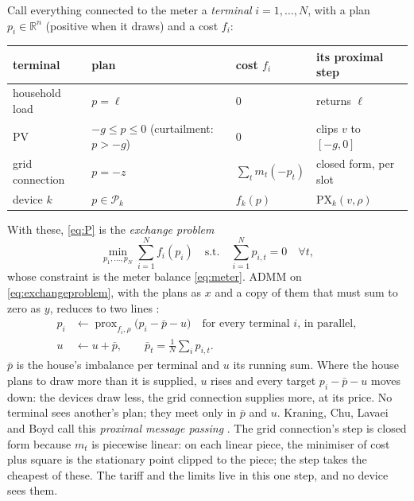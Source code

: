 \documentclass[11pt,a4paper]{article}
\newcommand{\R}{\mathbb{R}}
\newcommand{\PX}{\mathrm{PX}}
\newcommand{\Pk}{\mathcal P_k}
\begin{document}
Call everything connected to the meter a \emph{terminal} $i = 1,\dots,N$, with
a plan $p_i \in \R^n$ (positive when it draws) and a cost $f_i$:
\begin{center}
\small
\begin{tabular}{@{}llll@{}}
\toprule
terminal & plan & cost $f_i$ & its proximal step \\
\midrule
household load & $p = \ell$ & $0$ & returns $\ell$ \\
PV & $-g \le p \le 0$ (curtailment: $p > -g$) & $0$ & clips $v$ to $[-g, 0]$ \\
grid connection & $p = -z$ & $\sum_t m_t(-p_t)$ & closed form, per slot \\
device $k$ & $p \in \Pk$ & $f_k(p)$ & $\PX_k(v, \rho)$ \\
\bottomrule
\end{tabular}
\end{center}
With these, \eqref{eq:P} is the \emph{exchange problem}
\cite[\S7.3.2]{boyd2011}
\begin{equation}
  \min_{p_1,\dots,p_N} \sum_{i=1}^N f_i(p_i) \quad \text{s.t.} \quad
  \sum_{i=1}^N p_{i,t} = 0 \quad \forall t ,
  \label{eq:exchangeproblem}
\end{equation}
whose constraint is the meter balance \eqref{eq:meter}. ADMM on
\eqref{eq:exchangeproblem}, with the plans as $x$ and a copy of them that must
sum to zero as $y$, reduces to two lines \cite[\S7.3.2]{boyd2011}:
\begin{align}
  p_i &\leftarrow \operatorname{prox}_{f_i,\rho}\big(p_i - \bar p - u\big)
    \quad \text{for every terminal } i \text{, in parallel}, \label{eq:pmpstep}\\
  u &\leftarrow u + \bar p, \qquad \bar p_t = \tfrac{1}{N}\textstyle\sum_i p_{i,t} . \label{eq:pmpprice}
\end{align}
$\bar p$ is the house's imbalance per terminal and $u$ its running sum. Where the
house plans to draw more than it is supplied, $u$ rises and every target
$p_i - \bar p - u$ moves down: the devices draw less, the grid connection
supplies more, at its price. No terminal sees another's plan; they meet only in
$\bar p$ and $u$. Kraning, Chu, Lavaei and Boyd call this \emph{proximal message
passing} \cite{kraning2014}. The grid connection's step is closed form because
$m_t$ is piecewise linear: on each linear piece, the minimiser of cost plus
square is the stationary point clipped to the piece; the step takes the cheapest
of these. The tariff and the limits live in this one step, and no device sees
them.
\end{document}
